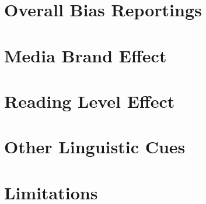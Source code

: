 \section{Overall Bias Reportings}


\section{Media Brand Effect}

\section{Reading Level Effect}

\section{Other Linguistic Cues}

\section{Limitations}

%
 